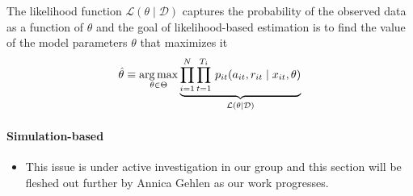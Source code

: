 \noindent The likelihood function $\mathcal{L}(\theta\mid\mathcal{D})$ captures the probability of the observed data as a function of $\theta$ and the goal of likelihood-based estimation is to find the value of the model parameters $\theta$ that maximizes it
%
\begin{align*}
  \hat{\theta} \equiv \operatorname*{arg\,max}_{\theta \in \Theta}  \underbrace{\prod^N_{i= 1} \prod^{T_i}_{t= 1}\, p_{it}(a_{it}, r_{it} \mid x_{it}, \theta)}_{\mathcal{L}(\theta\mid\mathcal{D})}
\end{align*}

\paragraph{Simulation-based}

\begin{itemize}
  \item This issue is under active investigation in our group and this section will be fleshed out further by Annica Gehlen as our work progresses.
\end{itemize}

